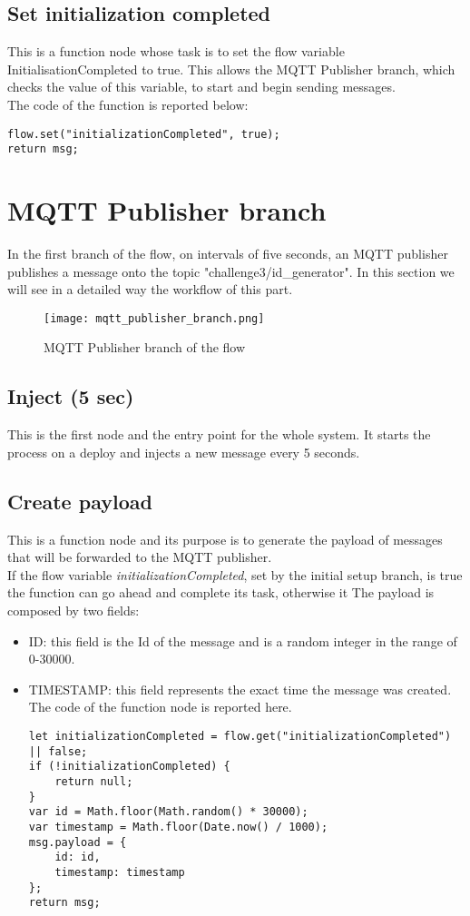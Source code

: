 \subsection{Set initialization completed}
This is a function node whose task is to set the flow variable InitialisationCompleted to true.
This allows the MQTT Publisher branch, which checks the value of this variable, to start and begin sending messages.\\
The code of the function is reported below:
\begin{verbatim}
flow.set("initializationCompleted", true);
return msg;
\end{verbatim}


\section{MQTT Publisher branch}
\label{sec:publisher_branch}
In the first branch of the flow, on intervals of five seconds, an MQTT publisher publishes a message onto the topic "challenge3/id\_generator". In this section we will see in a detailed way the workflow of this part.
\begin{figure}[H]
    \centering
    \texttt{[image: mqtt\_publisher\_branch.png]}
    \caption{MQTT Publisher branch of the flow}
\end{figure}

\subsection{Inject (5 sec)}
This is the first node and the entry point for the whole system. It starts the process on a deploy and injects a new message every 5 seconds.

\subsection{Create payload}
This is a function node and its purpose is to generate the payload of messages that will be forwarded to the MQTT publisher. \\
If the flow variable \textit{initializationCompleted}, set by the initial setup branch, is true the function can go ahead and complete its task, otherwise it 
The payload is composed by two fields:
\begin{itemize}
\item ID: this field is the Id of the message and is a random integer in the range of 0-30000.
\item TIMESTAMP: this field represents the exact time the message was created.
The code of the function node is reported here.
\begin{verbatim}
let initializationCompleted = flow.get("initializationCompleted") || false;
if (!initializationCompleted) {
    return null;    
}
var id = Math.floor(Math.random() * 30000);
var timestamp = Math.floor(Date.now() / 1000);
msg.payload = {
    id: id,
    timestamp: timestamp
};
return msg;
\end{verbatim}
\end{itemize}


